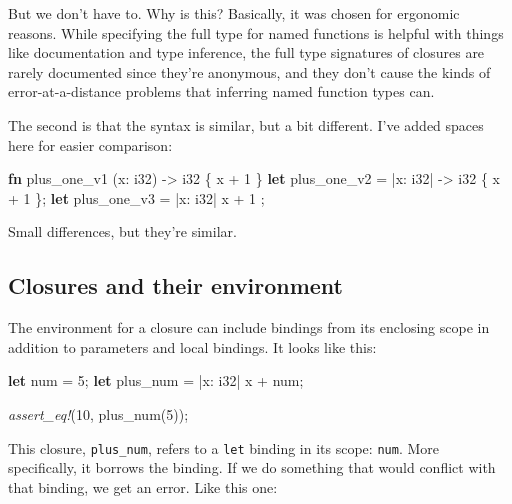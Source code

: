 \documentclass[a4paper,]{book}
\newenvironment{Shaded}{\begin{snugshade}}{\end{snugshade}}
\newcommand{\KeywordTok}[1]{\textcolor[rgb]{0.13,0.29,0.53}{\textbf{{#1}}}}
\newcommand{\DataTypeTok}[1]{\textcolor[rgb]{0.13,0.29,0.53}{{#1}}}
\newcommand{\DecValTok}[1]{\textcolor[rgb]{0.00,0.00,0.81}{{#1}}}
\newcommand{\PreprocessorTok}[1]{\textcolor[rgb]{0.56,0.35,0.01}{\textit{{#1}}}}
\newcommand{\NormalTok}[1]{{#1}}
\begin{document}
But we don't have to. Why is this? Basically, it was chosen for
ergonomic reasons. While specifying the full type for named functions is
helpful with things like documentation and type inference, the full type
signatures of closures are rarely documented since they're anonymous,
and they don't cause the kinds of error-at-a-distance problems that
inferring named function types can.

The second is that the syntax is similar, but a bit different. I've
added spaces here for easier comparison:

\begin{Shaded}
\begin{Highlighting}[]
\KeywordTok{fn}  \NormalTok{plus_one_v1   (x: }\DataTypeTok{i32}\NormalTok{) -> }\DataTypeTok{i32} \NormalTok{\{ x + }\DecValTok{1} \NormalTok{\}}
\KeywordTok{let} \NormalTok{plus_one_v2 = |x: }\DataTypeTok{i32}\NormalTok{| -> }\DataTypeTok{i32} \NormalTok{\{ x + }\DecValTok{1} \NormalTok{\};}
\KeywordTok{let} \NormalTok{plus_one_v3 = |x: }\DataTypeTok{i32}\NormalTok{|          x + }\DecValTok{1}  \NormalTok{;}
\end{Highlighting}
\end{Shaded}

Small differences, but they're similar.

\subsection{Closures and their
environment}\label{closures-and-their-environment}

The environment for a closure can include bindings from its enclosing
scope in addition to parameters and local bindings. It looks like this:

\begin{Shaded}
\begin{Highlighting}[]
\KeywordTok{let} \NormalTok{num = }\DecValTok{5}\NormalTok{;}
\KeywordTok{let} \NormalTok{plus_num = |x: }\DataTypeTok{i32}\NormalTok{| x + num;}

\PreprocessorTok{assert_eq!}\NormalTok{(}\DecValTok{10}\NormalTok{, plus_num(}\DecValTok{5}\NormalTok{));}
\end{Highlighting}
\end{Shaded}

This closure, \texttt{plus\_num}, refers to a \texttt{let} binding in
its scope: \texttt{num}. More specifically, it borrows the binding. If
we do something that would conflict with that binding, we get an error.
Like this one:
\end{document}
